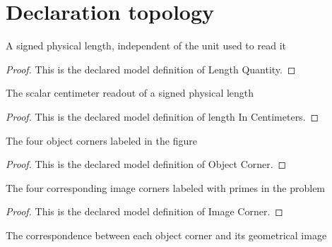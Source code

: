 \section{Declaration topology}
\begin{definition}
  \label{def:physics:phyx-mini-0027:phyxminiproblems-problemphyxmini0027-lengthquantity}
  A signed physical length, independent of the unit used to read it
\end{definition}
\begin{proof}
  This is the declared model definition of Length Quantity.
\end{proof}
\begin{definition}
  \label{def:physics:phyx-mini-0027:phyxminiproblems-problemphyxmini0027-lengthincentimeters}
  The scalar centimeter readout of a signed physical length
\end{definition}
\begin{proof}
  This is the declared model definition of length In Centimeters.
\end{proof}
\begin{definition}
  \label{def:physics:phyx-mini-0027:phyxminiproblems-problemphyxmini0027-objectcorner}
  The four object corners labeled in the figure
\end{definition}
\begin{proof}
  This is the declared model definition of Object Corner.
\end{proof}
\begin{definition}
  \label{def:physics:phyx-mini-0027:phyxminiproblems-problemphyxmini0027-imagecorner}
  The four corresponding image corners labeled with primes in the problem
\end{definition}
\begin{proof}
  This is the declared model definition of Image Corner.
\end{proof}
\begin{definition}
  \label{def:physics:phyx-mini-0027:phyxminiproblems-problemphyxmini0027-correspondingimage}
  The correspondence between each object corner and its geometrical image
\end{definition}
